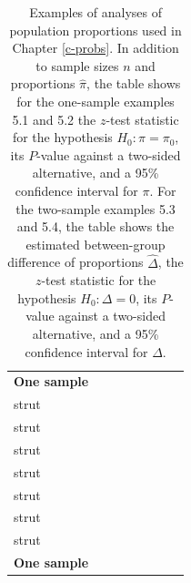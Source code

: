 \documentclass[11pt,a4paper,openany]{book}
\begin{document}
\begin{longtable}[]{@{}lrrrrrrr@{}}
\caption{\label{tab:t-probex} Examples of analyses of population proportions
used in Chapter \ref{c-probs}. In addition to sample sizes \(n\) and
proportions \(\hat{\pi}\), the table shows for the one-sample examples
5.1 and 5.2 the \(z\)-test statistic for the hypothesis
\(H_{0}: \pi=\pi_{0}\), its \(P\)-value against a two-sided alternative,
and a 95\% confidence interval for \(\pi\). For the two-sample examples
5.3 and 5.4, the table shows the estimated between-group difference of
proportions \(\hat{\Delta}\), the \(z\)-test statistic for the
hypothesis \(H_{0}: \Delta=0\), its \(P\)-value against a two-sided
alternative, and a 95\% confidence interval for
\(\Delta\).}\tabularnewline
\toprule
\begin{minipage}[b]{0.35\columnwidth}\raggedright\strut
\textbf{One sample}\strut
\end{minipage} & \begin{minipage}[b]{0.05\columnwidth}\raggedleft\strut
\\strut
\end{minipage} & \begin{minipage}[b]{0.04\columnwidth}\raggedleft\strut
\\strut
\end{minipage} & \begin{minipage}[b]{0.06\columnwidth}\raggedleft\strut
\\strut
\end{minipage} & \begin{minipage}[b]{0.11\columnwidth}\raggedleft\strut
\\strut
\end{minipage} & \begin{minipage}[b]{0.05\columnwidth}\raggedleft\strut
\\strut
\end{minipage} & \begin{minipage}[b]{0.05\columnwidth}\raggedleft\strut
\\strut
\end{minipage} & \begin{minipage}[b]{0.07\columnwidth}\raggedleft\strut
\\strut
\end{minipage}\tabularnewline
\midrule
\endfirsthead
\toprule
\begin{minipage}[b]{0.35\columnwidth}\raggedright\strut
\textbf{One sample}\strut
\end{minipage} & \begin{minipage}[b]{0.05\columnwidth}\raggedleft\strut

\end{minipage}
\end{longtable}
\end{document}

